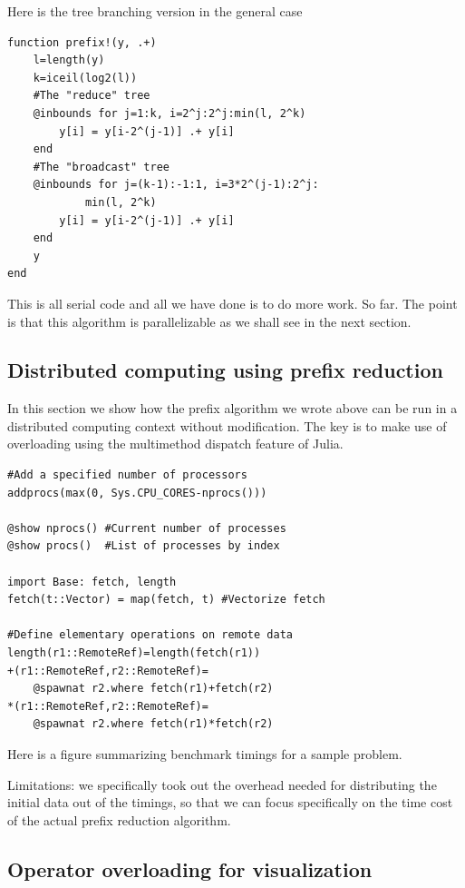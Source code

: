 \documentclass{sig-alternate}
\begin{document}
Here is the tree branching version in the general case

\begin{verbatim}
function prefix!(y, .+)
    l=length(y)
    k=iceil(log2(l))
    #The "reduce" tree
    @inbounds for j=1:k, i=2^j:2^j:min(l, 2^k)
        y[i] = y[i-2^(j-1)] .+ y[i]
    end
    #The "broadcast" tree
    @inbounds for j=(k-1):-1:1, i=3*2^(j-1):2^j:
            min(l, 2^k)
        y[i] = y[i-2^(j-1)] .+ y[i]
    end
    y
end
\end{verbatim}

This is all serial code and all we have done is to do more work. So far. The point is that this algorithm is parallelizable as we shall see in the next section.

\subsection{Distributed computing using prefix reduction}

In this section we show how the prefix algorithm we wrote above can be run in a distributed computing context without modification. The key is to make use of overloading using the multimethod dispatch feature of Julia.

\begin{verbatim}
#Add a specified number of processors
addprocs(max(0, Sys.CPU_CORES-nprocs()))

@show nprocs() #Current number of processes
@show procs()  #List of processes by index

import Base: fetch, length
fetch(t::Vector) = map(fetch, t) #Vectorize fetch

#Define elementary operations on remote data
length(r1::RemoteRef)=length(fetch(r1))
+(r1::RemoteRef,r2::RemoteRef)=
    @spawnat r2.where fetch(r1)+fetch(r2)
*(r1::RemoteRef,r2::RemoteRef)=
    @spawnat r2.where fetch(r1)*fetch(r2)
\end{verbatim}

Here is a figure summarizing benchmark timings for a sample problem.

Limitations: we specifically took out the overhead needed for distributing the initial data out of the timings, so that we can focus specifically on the time cost of the actual prefix reduction algorithm.

\subsection{Operator overloading for visualization}
\end{document}
